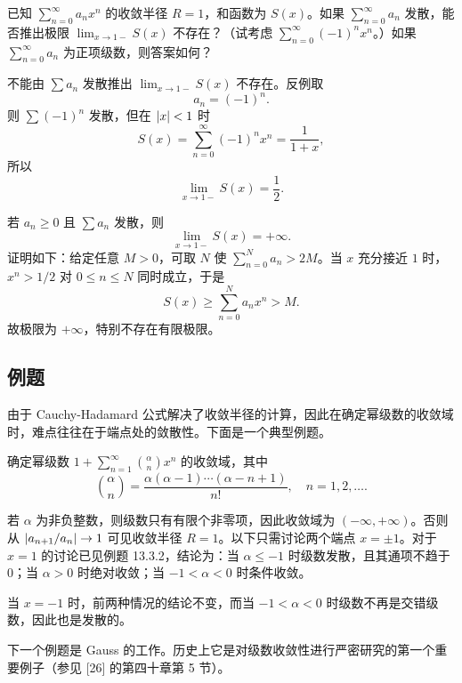 \begin{xthought}[7]
已知 $\displaystyle\sum_{n=0}^{\infty}a_nx^n$ 的收敛半径 $R=1$，和函数为 $S(x)$。如果 $\displaystyle\sum_{n=0}^{\infty}a_n$ 发散，能否推出极限 $\displaystyle\lim_{x\to1-}S(x)$ 不存在？（试考虑 $\displaystyle\sum_{n=0}^{\infty}(-1)^nx^n$。）如果 $\displaystyle\sum_{n=0}^{\infty}a_n$ 为正项级数，则答案如何？
\end{xthought}
\begin{xsolution}
不能由 $\sum a_n$ 发散推出 $\lim_{x\to1-}S(x)$ 不存在。反例取
\[
  a_n=(-1)^n.
\]
则 $\sum(-1)^n$ 发散，但在 $\lvert x\rvert<1$ 时
\[
  S(x)=\sum_{n=0}^{\infty}(-1)^nx^n=\frac1{1+x},
\]
所以
\[
  \lim_{x\to1-}S(x)=\frac12.
\]

若 $a_n\geqslant0$ 且 $\sum a_n$ 发散，则
\[
  \lim_{x\to1-}S(x)=+\infty.
\]
证明如下：给定任意 $M>0$，可取 $N$ 使 $\sum_{n=0}^Na_n>2M$。当 $x$ 充分接近 $1$ 时，$x^n>1/2$ 对 $0\leqslant n\leqslant N$ 同时成立，于是
\[
  S(x)\geqslant\sum_{n=0}^Na_nx^n>M.
\]
故极限为 $+\infty$，特别不存在有限极限。
\end{xsolution}


\subsection{例题}

由于 Cauchy-Hadamard 公式解决了收敛半径的计算，因此在确定幂级数的收敛域时，难点往往在于端点处的敛散性。下面是一个典型例题。

\begin{xexample}[14.3.1]
确定幂级数 $\displaystyle 1+\sum_{n=1}^{\infty}\binom{\alpha}{n}x^n$ 的收敛域，其中
\[
  \binom{\alpha}{n}=\frac{\alpha(\alpha-1)\cdots(\alpha-n+1)}{n!},\quad n=1,2,\ldots.
\]
\end{xexample}
\begin{xsolution}
若 $\alpha$ 为非负整数，则级数只有有限个非零项，因此收敛域为 $(-\infty,+\infty)$。否则从 $\lvert a_{n+1}/a_n\rvert\to1$ 可见收敛半径 $R=1$。以下只需讨论两个端点 $x=\pm1$。对于 $x=1$ 的讨论已见例题 13.3.2，结论为：当 $\alpha\leqslant-1$ 时级数发散，且其通项不趋于 $0$；当 $\alpha>0$ 时绝对收敛；当 $-1<\alpha<0$ 时条件收敛。

当 $x=-1$ 时，前两种情况的结论不变，而当 $-1<\alpha<0$ 时级数不再是交错级数，因此也是发散的。
\end{xsolution}

下一个例题是 Gauss 的工作。历史上它是对级数收敛性进行严密研究的第一个重要例子（参见 [26] 的第四十章第 5 节）。

